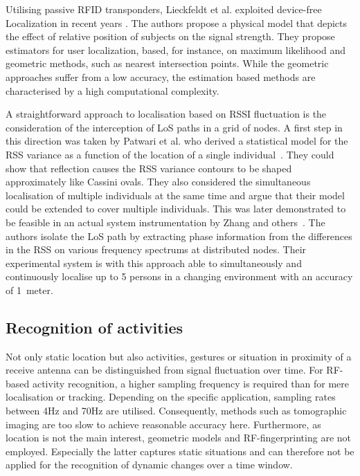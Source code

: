\documentclass[journal]{IEEEtran}
\begin{document}
\begin{figure*}
Utilising passive RFID transponders, Lieckfeldt et al. exploited device-free Localization in recent years \cite{RFSensing_Lieckfeldt_2009,RFSensing_Lieckfeldt_2009b}.
The authors propose a physical model that depicts the effect of relative position of subjects on the signal strength. 
They propose estimators for user localization, based, for instance, on maximum likelihood and geometric methods, such as nearest intersection points.
While the geometric approaches suffer from a low accuracy, the estimation based methods are characterised by a high computational complexity.



A straightforward approach to localisation based on RSSI fluctuation is the consideration of the interception of LoS paths in a grid of nodes. 
A first step in this direction was taken by Patwari et al. who derived a statistical model for the RSS variance as a function of the location of a single individual~\cite{RFSensing_Patwari_2011}.
They could show that reflection causes the RSS variance contours to be shaped approximately like Cassini ovals. 
They also considered the simultaneous localisation of multiple individuals at the same time and argue that their model could be extended to cover multiple individuals.
This was later demonstrated to be feasible in an actual system instrumentation by Zhang and others~\cite{Pervasive_Zhang_2012}.
The authors isolate the LoS path by extracting phase information from the differences in the RSS on various frequency spectrums at distributed nodes.
Their experimental system is with this approach able to simultaneously and continuously localise up to 5 persons in a changing environment with an accuracy of 1~meter.

\subsection{Recognition of activities}
Not only static location but also activities, gestures or situation in proximity of a receive antenna can be distinguished from signal fluctuation over time. 
For RF-based activity recognition, a higher sampling frequency is required than for mere localisation or tracking. 
Depending on the specific application, sampling rates between 4Hz and 70Hz are utilised.
Consequently, methods such as tomographic imaging are too slow to achieve reasonable accuracy here.
Furthermore, as location is not the main interest, geometric models and RF-fingerprinting are not employed.
Especially the latter captures static situations and can therefore not be applied for the recognition of dynamic changes over a time window.


\end{figure*}
\end{document}
